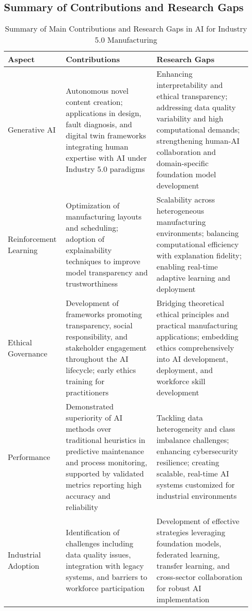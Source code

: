 \documentclass[sigconf]{acmart}
\begin{document}
\subsection{Summary of Contributions and Research Gaps}

\begin{table*}[htbp]
\centering
\caption{Summary of Main Contributions and Research Gaps in AI for Industry 5.0 Manufacturing}
\label{tab:contributions_gaps}
\begin{adjustbox}{max width=\textwidth}
\begin{tabular}{@{}lll@{}}
\toprule
\textbf{Aspect} & \textbf{Contributions} & \textbf{Research Gaps} \\
\midrule
Generative AI & Autonomous novel content creation; applications in design, fault diagnosis, and digital twin frameworks integrating human expertise with AI under Industry 5.0 paradigms~\cite{ref1,ref2,ref6} & Enhancing interpretability and ethical transparency; addressing data quality variability and high computational demands; strengthening human-AI collaboration and domain-specific foundation model development~\cite{ref3,ref14} \\
Reinforcement Learning & Optimization of manufacturing layouts and scheduling; adoption of explainability techniques to improve model transparency and trustworthiness~\cite{ref5,ref30} & Scalability across heterogeneous manufacturing environments; balancing computational efficiency with explanation fidelity; enabling real-time adaptive learning and deployment~\cite{ref35,ref36} \\
Ethical Governance & Development of frameworks promoting transparency, social responsibility, and stakeholder engagement throughout the AI lifecycle; early ethics training for practitioners~\cite{ref25,ref38} & Bridging theoretical ethical principles and practical manufacturing applications; embedding ethics comprehensively into AI development, deployment, and workforce skill development~\cite{ref19,ref21} \\
Performance & Demonstrated superiority of AI methods over traditional heuristics in predictive maintenance and process monitoring, supported by validated metrics reporting high accuracy and reliability~\cite{ref4,ref24,ref32} & Tackling data heterogeneity and class imbalance challenges; enhancing cybersecurity resilience; creating scalable, real-time AI systems customized for industrial environments~\cite{ref29,ref35,ref39} \\
Industrial Adoption & Identification of challenges including data quality issues, integration with legacy systems, and barriers to workforce participation~\cite{ref3,ref7} & Development of effective strategies leveraging foundation models, federated learning, transfer learning, and cross-sector collaboration for robust AI implementation~\cite{ref5,ref8} \\

\end{tabular}
\end{adjustbox}
\end{table*}
\end{document}
